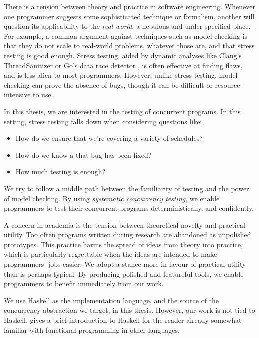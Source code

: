 There is a tension between theory and practice in software
engineering.  Whenever one programmer suggests some sophisticated
technique or formalism, another will question its applicability to the
\emph{real world}, a nebulous and under-specified place.  For example,
a common argument against techniques such as model checking is that
they do not scale to real-world problems, whatever those are, and that
stress testing is good enough.  Stress testing, aided by dynamic
analyses like Clang's ThreadSanitizer \parencite{serebryany2009} or
Go's data race detector \parencite{golang2017}, is often effective at
finding flaws, and is less alien to most programmers.  However, unlike
stress testing, model checking can prove the absence of bugs, though
it can be difficult or resource-intensive to use.

In this thesis, we are interested in the testing of concurrent
programs.  In this setting, stress testing falls down when considering
questions like:

\begin{itemize}
\item How do we ensure that we're covering a variety of schedules?
\item How do we know a that bug has been fixed?
\item How much testing is enough?
\end{itemize}

We try to follow a middle path between the familiarity of testing and
the power of model checking.  By using \emph{systematic concurrency
  testing}, we enable programmers to test their concurrent programs
deterministically, and confidently.

A concern in academia is the tension between theoretical novelty and
practical utility.  Too often programs written during research are
abandoned as unpolished prototypes.  This practice harms the spread of
ideas from theory into practice, which is particularly regrettable
when the ideas are intended to make programmers' jobs easier.  We
adopt a stance more in favour of practical utility than is perhaps
typical.  By producing polished and featureful tools, we enable
programmers to benefit immediately from our work.

We use Haskell as the implementation language, and the source of the
concurrency abstraction we target, in this thesis.  However, our work
is not tied to Haskell.   gives a brief introduction
to Haskell for the reader already somewhat familiar with functional
programming in other languages.

